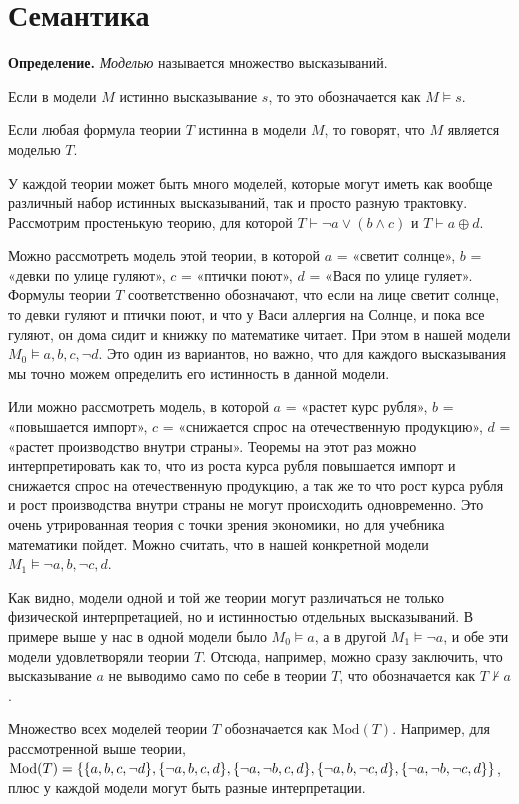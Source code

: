 \section{Семантика}

{\bfseries Определение.} {\slshape Моделью} называется множество высказываний.

Если в модели $M$ истинно высказывание $s$, то это обозначается как $M\models s$.

Если любая формула теории $T$ истинна в модели $M$, то говорят, что $M$ является моделью $T$.

У каждой теории может быть много моделей, которые могут иметь как вообще различный набор истинных высказываний, так и просто разную трактовку. Рассмотрим простенькую теорию, для которой $T\vdash \neg a \vee (b \wedge c)$ и $T\vdash a \oplus d$.

Можно рассмотреть модель этой теории, в которой $a$ = «светит солнце», $b$ = «девки по улице гуляют», $c$ = «птички поют», $d$ = «Вася по улице гуляет». Формулы теории $T$ соответственно обозначают, что если на лице светит солнце, то девки гуляют и птички поют, и что у Васи аллергия на Солнце, и пока все гуляют, он дома сидит и книжку по математике читает. При этом в нашей модели $M_0\models a, b, c, \neg d$. Это один из вариантов, но важно, что для каждого высказывания мы точно можем определить его истинность в данной модели.

Или можно рассмотреть модель, в которой $a$ = «растет курс рубля», $b$ = «повышается импорт», $c$ = «снижается спрос на отечественную продукцию», $d$ = «растет производство внутри страны». Теоремы на этот раз можно интерпретировать как то, что из роста курса рубля повышается импорт и снижается спрос на отечественную продукцию, а так же то что рост курса рубля и рост производства внутри страны не могут происходить одновременно. Это очень утрированная теория с точки зрения экономики, но для учебника математики пойдет. Можно считать, что в нашей конкретной модели $M_1\models \neg a, b, \neg c, d$.

Как видно, модели одной и той же теории могут различаться не только физической интерпретацией, но и истинностью отдельных высказываний. В примере выше у нас в одной модели было $M_0\models a$, а в другой $M_1\models \neg a$, и обе эти модели удовлетворяли теории $T$. Отсюда, например, можно сразу заключить, что высказывание $a$ не выводимо само по себе в теории $T$, что обозначается как $T\not\vdash a$.

Множество всех моделей теории $T$ обозначается как $\mathrm{Mod}(T)$. Например, для рассмотренной выше теории,\\
$\mathrm{Mod}(T) = \{\{a, b, c, \neg d\}, \{\neg a, b, c, d\}, \{\neg a, \neg b, c, d\}, \{\neg a, b, \neg c, d\},\\ \{\neg a, \neg b,\neg c, d\}\}$, плюс у каждой модели могут быть разные интерпретации.

